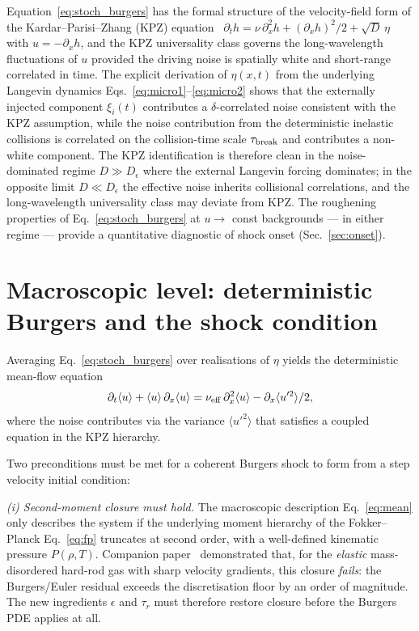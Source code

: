 \documentclass[aps,pre,twocolumn,superscriptaddress,longbibliography,floatfix]{revtex4-2}
\begin{document}
Equation~\eqref{eq:stoch_burgers} has the formal structure
of the velocity-field form of the
Kardar--Parisi--Zhang (KPZ) equation~\cite{KPZ1986}
$\partial_t h = \nu\,\partial_x^2 h + (\partial_x h)^2/2
+ \sqrt{D}\,\eta$ with $u = -\partial_x h$, and the KPZ
universality class governs the long-wavelength
fluctuations of $u$ provided the driving noise is
spatially white and short-range correlated in time. The
explicit derivation of $\eta(x,t)$ from the underlying
Langevin dynamics
Eqs.~\eqref{eq:micro1}--\eqref{eq:micro2}
shows that the externally injected component $\xi_i(t)$
contributes a $\delta$-correlated noise consistent with
the KPZ assumption, while the noise contribution from the
deterministic inelastic collisions is correlated on the
collision-time scale $\tau_{\rm break}$ and contributes a
non-white component. The KPZ identification is therefore
clean in the noise-dominated regime $D\gg D_\epsilon$
where the external Langevin forcing dominates; in the
opposite limit $D\ll D_\epsilon$ the effective noise
inherits collisional correlations, and the long-wavelength
universality class may deviate from KPZ. The roughening
properties of Eq.~\eqref{eq:stoch_burgers} at
$u\to$ const backgrounds — in either regime — provide a
quantitative diagnostic of shock onset
(Sec.~\ref{sec:onset}).

\section{Macroscopic level: deterministic Burgers and the
shock condition}\label{sec:macro}

Averaging Eq.~\eqref{eq:stoch_burgers} over realisations of
$\eta$ yields the deterministic mean-flow equation
\begin{equation}
\partial_t \langle u\rangle
+ \langle u\rangle\,\partial_x \langle u\rangle =
\nu_{\rm eff}\,\partial_x^2\langle u\rangle
- \partial_x\langle u'^2\rangle/2,
\label{eq:mean}
\end{equation}
where the noise contributes via the variance
$\langle u'^2\rangle$ that satisfies a coupled equation in the
KPZ hierarchy.

Two preconditions must be met for a coherent Burgers shock to
form from a step velocity initial condition:

\emph{(i) Second-moment closure must hold.} The macroscopic
description Eq.~\eqref{eq:mean} only describes the system if
the underlying moment hierarchy of the Fokker--Planck
Eq.~\eqref{eq:fp} truncates at second order, with a
well-defined kinematic pressure
$P(\rho,T)$. Companion paper~\cite{PaperIII} demonstrated
that, for the \emph{elastic} mass-disordered hard-rod gas with
sharp velocity gradients, this closure \emph{fails}: the
Burgers/Euler residual exceeds the discretisation floor by an
order of magnitude. The new ingredients $\epsilon$ and
$\tau_r$ must therefore restore closure before the
Burgers PDE applies at all.
\end{document}
